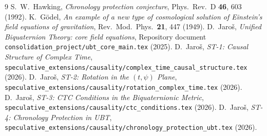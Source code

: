 \documentclass[12pt]{article}
\begin{document}

\begin{thebibliography}{9}
  S.~W.~Hawking,
  \emph{Chronology protection conjecture},
  Phys.\ Rev.\ D \textbf{46}, 603 (1992).
  K.~Gödel,
  \emph{An example of a new type of cosmological solution of Einstein's
  field equations of gravitation},
  Rev.\ Mod.\ Phys.\ \textbf{21}, 447 (1949).
  D.~Jaroš,
  \emph{Unified Biquaternion Theory: core field equations},
  Repository document \texttt{consolidation\_project/ubt\_core\_main.tex} (2025).
  D.~Jaroš,
  \emph{ST-1: Causal Structure of Complex Time},
  \texttt{speculative\_extensions/causality/complex\_time\_causal\_structure.tex}
  (2026).
  D.~Jaroš,
  \emph{ST-2: Rotation in the $(t,\psi)$ Plane},
  \texttt{speculative\_extensions/causality/rotation\_complex\_time.tex}
  (2026).
  D.~Jaroš,
  \emph{ST-3: CTC Conditions in the Biquaternionic Metric},
  \texttt{speculative\_extensions/causality/ctc\_conditions.tex} (2026).
  D.~Jaroš,
  \emph{ST-4: Chronology Protection in UBT},
  \texttt{speculative\_extensions/causality/chronology\_protection\_ubt.tex}
  (2026).
\end{thebibliography}
\end{document}
